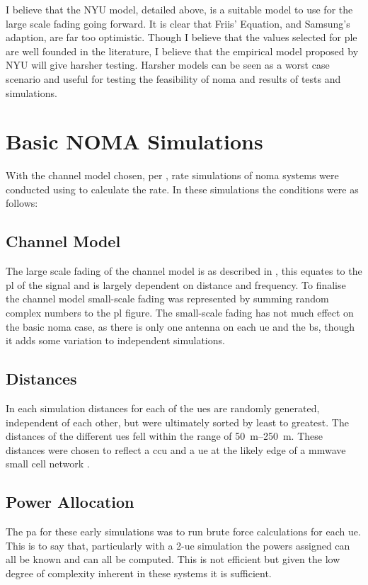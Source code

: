 \par
I believe that the NYU model, detailed above, is a suitable model to use for the large scale fading going forward.
It is clear that Friis' Equation, and Samsung's adaption, are far too optimistic.
Though I believe that the values selected for \ac{ple} are well founded in the literature, I believe that the empirical model proposed by NYU will give harsher testing.
Harsher models can be seen as a worst case scenario and useful for testing the feasibility of \ac{noma} and results of tests and simulations.

\section{Basic NOMA Simulations}
\label{sec:basicsim}

\par
With the channel model chosen, per , rate simulations of \ac{noma} systems were conducted using  to calculate the rate.
In these simulations the conditions were as follows:

\subsection{Channel Model}
\label{sec:bnsch}
The large scale fading of the channel model is as described in , this equates to the \ac{pl} of the signal and is largely dependent on distance and frequency.
To finalise the channel model small-scale fading was represented by summing random complex numbers to the \ac{pl} figure.
The small-scale fading has not much effect on the basic \ac{noma} case, as there is only one antenna on each \ac{ue} and the \ac{bs}, though it adds some variation to independent simulations.

\subsection{Distances}
\label{sec:distances}
In each simulation distances for each of the \acp{ue} are randomly generated, independent of each other, but were ultimately sorted by least to greatest.
The distances of the different \acp{ue} fell within the range of \SIrange{50}{250}{\metre}.
These distances were chosen to reflect a \ac{ccu} and a \ac{ue} at the likely edge of a \ac{mmwave} small cell network \cite{nguyen:2017}.

\subsection{Power Allocation}
The \ac{pa} for these early simulations was to run brute force calculations for each \ac{ue}.
This is to say that, particularly with a 2-\ac{ue} simulation the powers assigned can all be known and can all be computed.
This is not efficient but given the low degree of complexity inherent in these systems it is sufficient.

